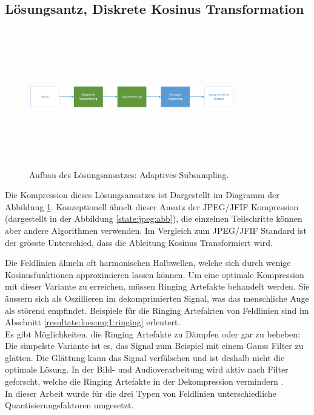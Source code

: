 \subsection{Lösungsantz, Diskrete Kosinus Transformation}\label{konzept:loesung1}
\begin{figure}[!htbp]
	\center
	\includegraphics[width=0.8\textwidth,height=6cm,keepaspectratio]{./pictures/konzept/solution0/aufbau.png}
	\caption{Aufbau des Lösungsansatzes: Adaptives Subsampling.}
	\label{konzept:loesung1:aufbau}
\end{figure} 
Die Kompression dieses Lösungsansatzes ist Dargestellt im Diagramm der Abbildung \ref{konzept:loesung1:aufbau}. Konzeptionell ähnelt dieser Ansatz der JPEG/JFIF Kompression (dargestellt in der Abbildung \ref{state:jpeg:abb}), die einzelnen Teilschritte können aber andere Algorithmen verwenden. Im Vergleich zum JPEG/JFIF Standard ist der grösste Unterschied, dass die Ableitung Kosinus Transformiert wird.

Die Feldlinien ähneln oft harmonischen Halbwellen, welche sich durch wenige Kosinusfunktionen approximieren lassen können. Um eine optimale Kompression mit dieser Variante zu erreichen, müssen Ringing Artefakte \cite{wiki:ringing:artefacts} behandelt werden. Sie äussern sich als Oszillieren im dekomprimierten Signal, was das menschliche Auge als störend empfindet. Beispiele für die Ringing Artefakten von Feldlinien sind im Abschnitt \ref{resultate:loesung1:ringing} erleutert.\\
Es gibt Möglichkeiten, die Ringing Artefakte zu Dämpfen oder gar zu beheben: Die simpelste Variante ist es, das Signal zum Beispiel mit einem Gauss Filter \cite{wiki:gauss:filter} zu glätten. Die Glättung kann das Signal verfälschen und ist deshalb nicht die optimale Lösung. In der Bild- und Audioverarbeitung wird aktiv nach Filter geforscht, welche die Ringing Artefakte in der Dekompression vermindern \cite{kaup1998reduction} \cite{park1999postprocessing}.\\
In dieser Arbeit wurde für die drei Typen von Feldlinien unterschiedliche Quantisierungsfaktoren umgesetzt.

